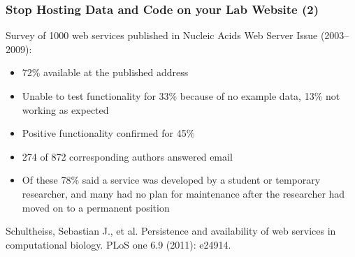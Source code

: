 \documentclass[slidestop]{beamer}
\begin{document}
\extrapagetemplate
\begin{frame}
  \frametitle{Stop Hosting Data and Code on your Lab Website (2)}
  Survey of 1000 web services published in Nucleic Acids Web
  Server Issue (2003--2009):
  \begin{itemize}
    \item 72\% available at the published address
    \item Unable to test functionality for 33\% because of no example data,
      13\% not working as expected
    \item Positive functionality confirmed for 45\%
    \item 274 of 872 corresponding authors answered email
    \item Of these 78\% said a service was developed by a student or temporary
      researcher, and many had no plan for maintenance after the researcher
      had moved on to a permanent position
  \end{itemize}
  Schultheiss, Sebastian J., et al. Persistence and availability of web
  services in computational biology. PLoS one 6.9 (2011): e24914.
\end{frame}
\end{document}
